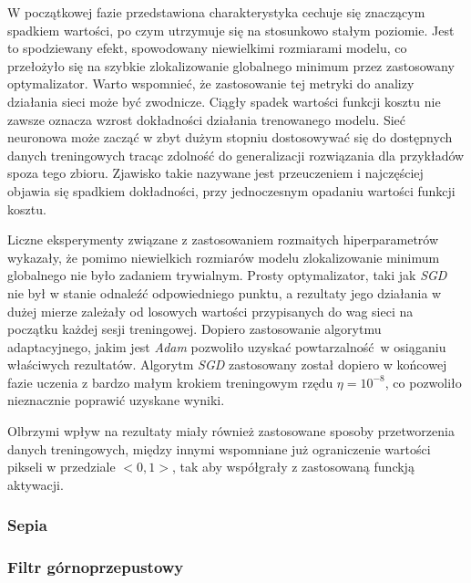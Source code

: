     W początkowej fazie przedstawiona charakterystyka cechuje się znaczącym spadkiem
    wartości, po czym utrzymuje się na stosunkowo stałym poziomie. Jest to spodziewany
    efekt, spowodowany niewielkimi rozmiarami modelu, co przełożyło się na szybkie
    zlokalizowanie globalnego minimum przez zastosowany optymalizator. Warto wspomnieć,
    że zastosowanie tej metryki do analizy działania sieci może być zwodnicze.
    Ciągły spadek wartości funkcji kosztu nie zawsze oznacza wzrost dokładności działania
    trenowanego modelu. Sieć neuronowa może zacząć w zbyt dużym stopniu dostosowywać się
    do dostępnych danych treningowych tracąc zdolność do generalizacji rozwiązania dla
    przykładów spoza tego zbioru. Zjawisko takie nazywane jest przeuczeniem i najczęściej
    objawia się spadkiem dokładności, przy jednoczesnym opadaniu wartości funkcji kosztu.

    Liczne eksperymenty związane z zastosowaniem rozmaitych hiperparametrów wykazały, że
    pomimo niewielkich rozmiarów modelu zlokalizowanie minimum globalnego nie było
    zadaniem trywialnym. Prosty optymalizator, taki jak \textit{SGD} nie był w stanie odnaleźć
    odpowiedniego punktu, a rezultaty jego działania w dużej mierze zależały od
    losowych wartości przypisanych do wag sieci na początku każdej sesji treningowej.
    Dopiero zastosowanie algorytmu adaptacyjnego, jakim jest \textit{Adam} pozwoliło
    uzyskać powtarzalność w osiąganiu właściwych rezultatów. Algorytm \textit{SGD}
    zastosowany został dopiero w końcowej fazie uczenia z bardzo małym krokiem
    treningowym rzędu $\eta = 10^{-8}$, co pozwoliło nieznacznie poprawić uzyskane
    wyniki.

    Olbrzymi wpływ na rezultaty miały również zastosowane sposoby przetworzenia danych
    treningowych, między innymi wspomniane już ograniczenie wartości pikseli
    w przedziale $<0,1>$, tak aby współgrały z zastosowaną funckją aktywacji.

  \subsubsection{Sepia}


  \subsubsection{Filtr górnoprzepustowy}
